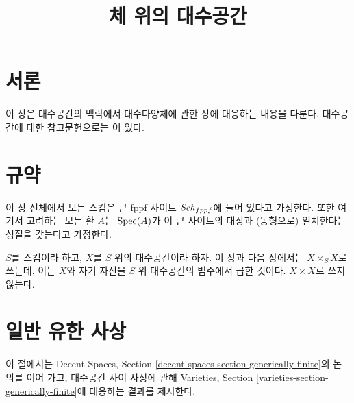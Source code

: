 

%


\title{체 위의 대수공간}


\maketitle

\label{section-phantom}

\tableofcontents

\section{서론}
\label{section-introduction}

\noindent
이 장은 대수공간의 맥락에서 대수다양체에 관한 장에 대응하는 내용을
다룬다. 대수공간에 대한 참고문헌으로는 \cite{Kn}이 있다.


\section{규약}
\label{section-conventions}

\noindent
이 장 전체에서 모든 스킴은 큰 fppf 사이트 $\mathit{Sch}_{fppf}$에 들어 있다고
가정한다. 또한 여기서 고려하는 모든 환 $A$는 $\mathop{\mathrm{Spec}}(A)$가 이 큰
사이트의 대상과 (동형으로) 일치한다는 성질을 갖는다고 가정한다.

\medskip\noindent
$S$를 스킴이라 하고, $X$를 $S$ 위의 대수공간이라 하자. 이 장과 다음
장에서는 $X \times_S X$로 쓰는데, 이는 $X$와 자기 자신을 $S$ 위
대수공간의 범주에서 곱한 것이다. $X \times X$로 쓰지 않는다.



\section{일반 유한 사상}
\label{section-generically-finite}

\noindent
이 절에서는 Decent Spaces, Section
\ref{decent-spaces-section-generically-finite}의 논의를 이어 가고,
대수공간 사이 사상에 관해 Varieties, Section
\ref{varieties-section-generically-finite}에 대응하는 결과를 제시한다.

